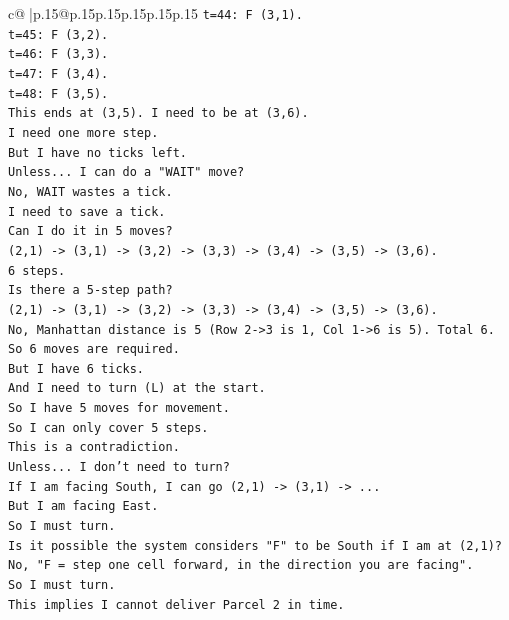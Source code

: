 \documentclass{article}
\begin{document}
{\begin{supertabular}{c@{$\;$}|p{.15\linewidth}@{}p{.15\linewidth}p{.15\linewidth}p{.15\linewidth}p{.15\linewidth}p{.15\linewidth}}
{{{\texttt{t=44: F (3,1).} \\
\texttt{t=45: F (3,2).} \\
\texttt{t=46: F (3,3).} \\
\texttt{t=47: F (3,4).} \\
\texttt{t=48: F (3,5).} \\
\texttt{This ends at (3,5). I need to be at (3,6).} \\
\texttt{I need one more step.} \\
\texttt{But I have no ticks left.} \\
\texttt{Unless... I can do a "WAIT" move?} \\
\texttt{No, WAIT wastes a tick.} \\
\texttt{I need to save a tick.} \\
\texttt{Can I do it in 5 moves?} \\
\texttt{(2,1) {-}> (3,1) {-}> (3,2) {-}> (3,3) {-}> (3,4) {-}> (3,5) {-}> (3,6).} \\
\texttt{6 steps.} \\
\texttt{Is there a 5{-}step path?} \\
\texttt{(2,1) {-}> (3,1) {-}> (3,2) {-}> (3,3) {-}> (3,4) {-}> (3,5) {-}> (3,6).} \\
\texttt{No, Manhattan distance is 5 (Row 2{-}>3 is 1, Col 1{-}>6 is 5). Total 6.} \\
\texttt{So 6 moves are required.} \\
\texttt{But I have 6 ticks.} \\
\texttt{And I need to turn (L) at the start.} \\
\texttt{So I have 5 moves for movement.} \\
\texttt{So I can only cover 5 steps.} \\
\texttt{This is a contradiction.} \\
\texttt{Unless... I don't need to turn?} \\
\texttt{If I am facing South, I can go (2,1) {-}> (3,1) {-}> ...} \\
\texttt{But I am facing East.} \\
\texttt{So I must turn.} \\
\texttt{Is it possible the system considers "F" to be South if I am at (2,1)?} \\
\texttt{No, "F = step one cell forward, in the direction you are facing".} \\
\texttt{So I must turn.} \\
\texttt{This implies I cannot deliver Parcel 2 in time.} \\
}}}
\end{supertabular}}
\end{document}
